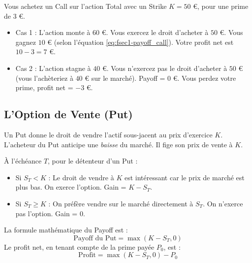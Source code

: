 \begin{examplebox}
Vous achetez un Call sur l'action Total avec un Strike $K = 50$ €, pour une prime de $3$ €.
\begin{itemize}[label=$\cdot$]
    \item Cas 1 : L'action monte à $60$ €. Vous exercez le droit d'acheter à $50$ €. Vous gagnez $10$ € (selon l'équation \ref{eq:fsec1-payoff_call}). Votre profit net est $10 - 3 = 7$ €.
    \item Cas 2 : L'action stagne à $40$ €. Vous n'exercez pas le droit d'acheter à $50$ € (vous l'achèteriez à $40$ € sur le marché). Payoff = $0$ €. Vous perdez votre prime, profit net = $-3$ €.
\end{itemize}
\end{examplebox}

\subsection{L'Option de Vente (Put)}

\begin{definitionbox}[Le Put]
Un Put donne le droit de vendre l'actif sous-jacent au prix d'exercice $K$.
L'acheteur du Put anticipe une \textit{baisse} du marché. Il fige son prix de vente à $K$.
\end{definitionbox}

À l'échéance $T$, pour le détenteur d'un Put :
\begin{itemize}[label=$\rightarrow$]
    \item Si $S_T < K$ : Le droit de vendre à $K$ est intéressant car le prix de marché est plus bas. On exerce l'option. Gain = $K - S_T$.
    \item Si $S_T \geq K$ : On préfère vendre sur le marché directement à $S_T$. On n'exerce pas l'option. Gain = $0$.
\end{itemize}
La formule mathématique du Payoff est :
\begin{equation}
    \label{eq:fsec1-payoff_put}
    \text{Payoff du Put} = \max(K - S_T, 0)
\end{equation}
Le profit net, en tenant compte de la prime payée $P_0$, est :
\begin{equation}
    \label{eq:fsec1-profit_put}
    \text{Profit} = \max(K - S_T, 0) - P_0
\end{equation}

